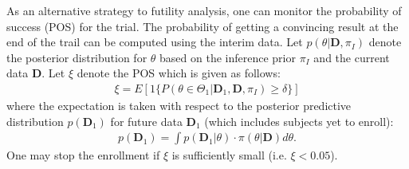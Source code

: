 \documentclass[12pt]{article}
\begin{document}
As an alternative strategy to futility analysis, one can monitor the probability of success (POS) for the trial. The probability of getting a convincing result at the end of the trail can be computed using the interim data. Let $p(\theta|\mathbf{D}, \pi_{I})$ denote the posterior distribution for $\theta$ based on the inference prior $ \pi_{I}$ and the current data $\mathbf{D}$. Let $\xi$ denote the POS which is given as follows:
\begin{align*}
\xi=E[1\{P(\theta\in\Theta_1|\mathbf{D}_1,\mathbf{D}, \pi_{I})\geq \delta\}]
\end{align*}
where the expectation is taken with respect to the posterior predictive distribution $p(\mathbf{D}_1)$ for future data $\mathbf{D}_1$ (which includes subjects yet to enroll):
\begin{align*}
p(\mathbf{D}_1)=\int p(\mathbf{D}_1|\theta)\cdot \pi(\theta|\mathbf{D})d\theta.
\end{align*}
One may stop the enrollment if $\xi$ is sufficiently small (i.e. $\xi<0.05$).




%
\end{document}
